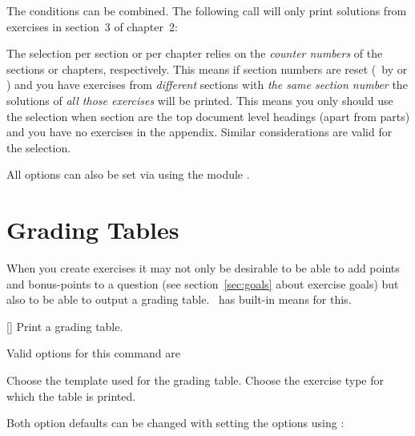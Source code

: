 \documentclass{xsim-manual}
\begin{document}
The conditions can be combined.  The following call will only print solutions
from exercises in section~3 of chapter~2:
\begin{sourcecode}
  \printsolutions[chapter=2,section=3]
\end{sourcecode}

\begin{bewareofthedog}
  The selection per section or per chapter relies on the \emph{counter
    numbers} of the sections or chapters, respectively.  This means if section
  numbers are reset (\eg\ by  or ) and you have
  exercises from \emph{different} sections with \emph{the same section number}
  the solutions of \emph{all those exercises} will be printed.  This means you
  only should use the  selection when section are the top
  document level headings (apart from parts) and you have no exercises in the
  appendix.  Similar considerations are valid for the 
  selection.
\end{bewareofthedog}

All options can also be set via  using the module
.

\begin{example}
  \printsolutions[section=4,headings-template=per-section]
\end{example}

\begin{example}
\end{example}

\section{Grading Tables}\label{sec:grading-tables}
When you create exercises it may not only be desirable to be able to add
points and bonus-points to a question (see section~\vref{sec:goals} about
exercise goals) but also to be able to output a grading table. \xsim\ has
built-in means for this.
\begin{commands}
  []
    Print a grading table.
\end{commands}
Valid options for this command are
\begin{options}
    Choose the template used for the grading table.
  \Default
    Choose the exercise type for which the table is printed.
\end{options}
Both option defaults can be changed with  setting the options
using :
\begin{sourcecode}
\end{sourcecode}
\end{document}
